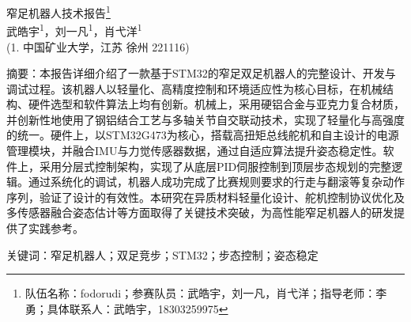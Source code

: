 \documentclass[a4paper,fontset=windows]{ctexart}
\author{}
\date{}
\begin{document}
\songti

\tableofcontents

\newpage

\pagestyle{fancy}


\begin{center}
\heiti 窄足机器人技术报告\footnote{队伍名称：fodorudi；参赛队员：武皓宇，刘一凡，肖弋洋；指导老师：李勇；具体联系人：武皓宇，18303259975} \\
\vspace{0.5cm}
 {\heiti 武皓宇\textsuperscript{1}，刘一凡\textsuperscript{1}，肖弋洋\textsuperscript{1}} \\
\vspace{0.2cm}
 (1. 中国矿业大学，江苏 徐州 221116)
\end{center}


{\heiti 摘要：}本报告详细介绍了一款基于STM32的窄足双足机器人的完整设计、开发与调试过程。该机器人以轻量化、高精度控制和环境适应性为核心目标，在机械结构、硬件选型和软件算法上均有创新。机械上，采用硬铝合金与亚克力复合材质，并创新性地使用了钢铝结合工艺与多轴关节自交联动技术，实现了轻量化与高强度的统一。硬件上，以STM32G473为核心，搭载高扭矩总线舵机和自主设计的电源管理模块，并融合IMU与力觉传感器数据，通过自适应算法提升姿态稳定性。软件上，采用分层式控制架构，实现了从底层PID伺服控制到顶层步态规划的完整逻辑。通过系统化的调试，机器人成功完成了比赛规则要求的行走与翻滚等复杂动作序列，验证了设计的有效性。本研究在异质材料轻量化设计、舵机控制协议优化及多传感器融合姿态估计等方面取得了关键技术突破，为高性能窄足机器人的研发提供了实践参考。

{\heiti 关键词：}窄足机器人；双足竞步；STM32；步态控制；姿态稳定
\end{document}

